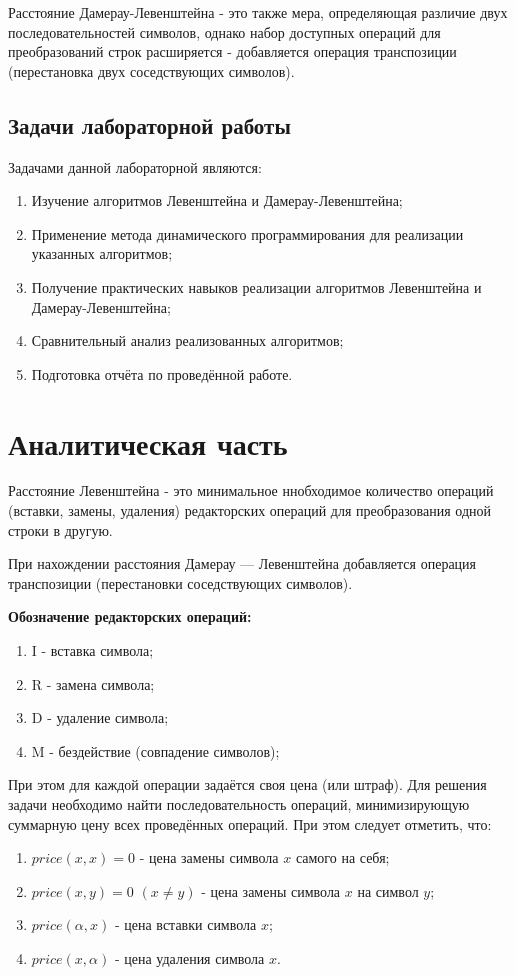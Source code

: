 \documentclass[12pt]{report}
\begin{document}
Расстояние Дамерау-Левенштейна - это также мера, определяющая различие двух последовательностей символов, однако набор доступных операций для преобразований строк расширяется - добавляется операция транспозиции (перестановка двух соседствующих символов).

\section*{Задачи лабораторной работы}
Задачами данной лабораторной являются:
\begin{enumerate}
  	\item Изучение алгоритмов Левенштейна и Дамерау-Левенштейна;
	\item Применение метода динамического программирования для реализации указанных алгоритмов; 
	\item Получение практических навыков реализации алгоритмов Левенштейна и Дамерау-Левенштейна; 
	\item Сравнительный анализ реализованных алгоритмов; 
	\item Подготовка отчёта по проведённой работе. 
\end{enumerate}


\chapter{Аналитическая часть}
Расстояние Левенштейна - это минимальное ннобходимое количество операций (вставки, замены, удаления) редакторских операций для преобразования одной строки в другую.

При нахождении расстояния Дамерау — Левенштейна добавляется операция транспозиции (перестановки соседствующих символов).  
 
\textbf{Обозначение редакторских операций:} 
\begin{enumerate}
	\item I - вставка символа;
	\item R - замена символа;
	\item D - удаление символа;
	\item M - бездействие (совпадение символов);
\end{enumerate}

При этом для каждой операции задаётся своя цена (или штраф). Для решения задачи необходимо найти последовательность операций, минимизирующую суммарную цену всех проведённых операций. При этом следует отметить, что:
\begin{enumerate}
	\item $price(x, x) = 0$ - цена замены символа $x$ самого на себя;
	\item $price(x, y) = 0$   $(x \neq y)$ - цена замены символа $x$ на символ $y$;
	\item $price(\alpha, x)$ - цена вставки символа $x$;
	\item $price(x, \alpha)$ - цена удаления символа $x$.
\end{enumerate}
\end{document}

